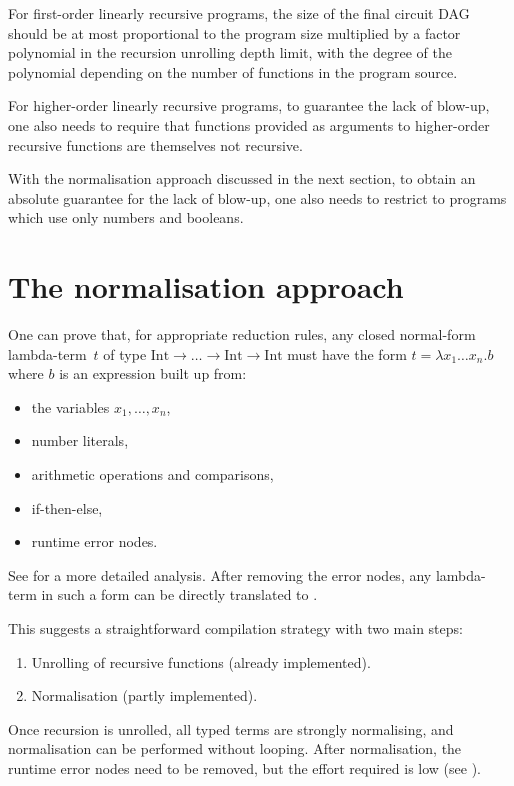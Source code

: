 \documentclass[
    9pt,            %
    techreport,        %
    affiltop,       %
]{art}
\begin{document}
For first-order linearly recursive programs, the size of the final
circuit DAG should be at most proportional to the program size
multiplied by a factor polynomial in the recursion unrolling depth
limit, with the degree of the polynomial depending on the number of
functions in the program source.

For higher-order linearly recursive programs, to guarantee the lack of
blow-up, one also needs to require that functions provided as arguments
to higher-order recursive functions are themselves not recursive.

With the normalisation approach discussed in the next section, to obtain an absolute guarantee for the lack of blow-up, one
also needs to restrict to programs which use only numbers and booleans.

\section{The normalisation approach}\label{sec_normalisation}

One can prove that, for appropriate reduction rules, any closed
\JuvixCore{} normal-form lambda-term~$t$ of type $\mathrm{Int} \to \ldots
\to \mathrm{Int} \to \mathrm{Int}$ must have the form $t = \lambda x_1
\ldots x_n . b$ where $b$ is an expression built up from:
\begin{itemize}
\item the variables $x_1,\ldots,x_n$,
\item number literals,
\item arithmetic operations and comparisons,
\item if-then-else,
\item runtime error nodes.
\end{itemize}
See  for a more detailed
analysis. After removing the error nodes, any lambda-term in such a form
can be directly translated to \VampIR{}.

This suggests a straightforward compilation strategy with two main
steps:
\begin{enumerate}
\item Unrolling of recursive functions (already implemented).
\item Normalisation (partly implemented).
\end{enumerate}
Once recursion is unrolled, all typed terms are strongly normalising,
and normalisation can be performed without looping. After
normalisation, the runtime error nodes need to be removed, but the effort required is low (see ).
\end{document}
